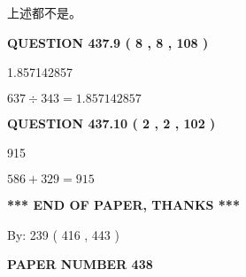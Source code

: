 \documentclass{ctexart}
\begin{document}
  
 
 
\noindent{}
 
 
 上述都不是。
 
 
 
 
  
\vspace{0.2in}
  
{\textbf{\Large{QUESTION
437.9 
 ( 8 , 8 , 108 )
}}}
  
  
 
 
\noindent{}

1.857142857
 
 
 
 
\noindent{}

$ %
637 \div  %
343=   %
1.857142857$
 
 
  
\vspace{0.2in}
  
{\textbf{\Large{QUESTION
437.10 
 ( 2 , 2 , 102 )
}}}
  
  
 
 
\noindent{}

915
 
 
 
 
\noindent{}

$ %
586 +  %
329=   %
915$
 
 
   
   
 \vspace{0.2in}
 
   
   
   
   
\vspace{1.0in} 
{\textbf{\large{ *** END OF PAPER, THANKS *** }}} 
   
   
\hspace{1.0in} By: 
 239 ( 416 ,  443 )
   
   
   
   
\newpage 
\setcounter{page}{ 
   438001 } 
   
   
   
   
 {\textbf{ \Large{ PAPER NUMBER  438  }}}
   
\end{document}
